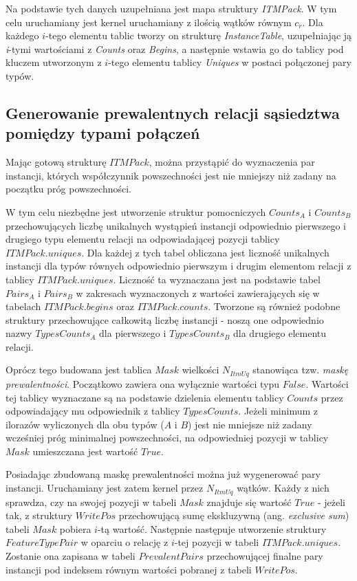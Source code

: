 \documentclass[12pt]{article}
\begin{document}
Na podstawie tych danych uzupełniana jest mapa struktury \textit{ITMPack}. W tym celu uruchamiany jest kernel uruchamiany z ilością wątków równym $ c_{r} $. Dla każdego $ i $-tego elementu tablic tworzy on strukturę \textit{InstanceTable}, uzupełniając ją \textit{i}-tymi wartościami z \textit{Counts} oraz \textit{Begins}, a następnie wstawia go do tablicy pod kluczem utworzonym z $i$-tego elementu tablicy \textit{Uniques} w postaci połączonej pary typów.

\subsection{Generowanie prewalentnych relacji sąsiedztwa pomiędzy typami połączeń}

Mając gotową strukturę $ ITMPack $, można przystąpić do wyznaczenia par instancji, których współczynnik powszechności jest nie mniejszy niż zadany na początku próg powszechności.

W tym celu niezbędne jest utworzenie struktur pomocniczych $ Counts_{A} $ i $ Counts_{B} $ przechowujących liczbę unikalnych wystąpień instancji odpowiednio pierwszego i drugiego typu elementu relacji na odpowiadającej pozycji tablicy $ ITMPack.uniques $. Dla każdej z tych tabel obliczana jest liczność unikalnych instancji dla typów równych odpowiednio pierwszym i drugim elementom relacji z tablicy \linebreak $ ITMPack.uniques $. Liczność ta wyznaczana jest na podstawie tabel $ Pairs_{A} $ i $ Pairs_{B} $ w zakresach wyznaczonych z wartości zawierających się w tabelach $ ITMPack.begins $ oraz $ ITMPack.counts $. Tworzone są również podobne struktury przechowujące całkowitą liczbę instancji - noszą one odpowiednio nazwy $ TypesCounts_{A} $ dla pierwszego i $ TypesCounts_{B} $ dla drugiego elementu relacji.

Oprócz tego budowana jest tablica $ Mask $ wielkości $ N_{ItmUq} $ stanowiąca tzw. \textit{maskę prewalentności}. Początkowo zawiera ona wyłącznie wartości typu $ False $. Wartości tej tablicy wyznaczane są na podstawie dzielenia elementu tablicy $ Counts $ przez odpowiadający mu odpowiednik z tablicy $ TypesCounts $. Jeżeli minimum z ilorazów wyliczonych dla obu typów ($ A $ i $ B $) jest nie mniejsze niż zadany wcześniej próg minimalnej powszechności, na odpowiedniej pozycji w tablicy $ Mask $ umieszczana jest wartość $ True $.

Posiadając zbudowaną maskę prewalentności można już wygenerować pary instancji. Uruchamiany jest zatem kernel przez $ N_{ItmUq} $ wątków. Każdy z nich sprawdza, czy na swojej pozycji w tabeli $ Mask $ znajduje się wartość $ True $ - jeżeli tak, z struktury $ WritePos $ przechowującą sumę ekskluzywną (ang. \textit{exclusive sum}) tabeli $ Mask $ pobiera $i$-tą wartość. Następnie następuje utworzenie struktury \linebreak $ FeatureTypePair $ w oparciu o relację z $ i $-tej pozycji w tabeli $ ITMPack.uniques$. Zostanie ona zapisana w tabeli $ PrevalentPairs $ przechowującej finalne pary instancji pod indeksem równym wartości pobranej z tabeli $ WritePos $.
\end{document}
